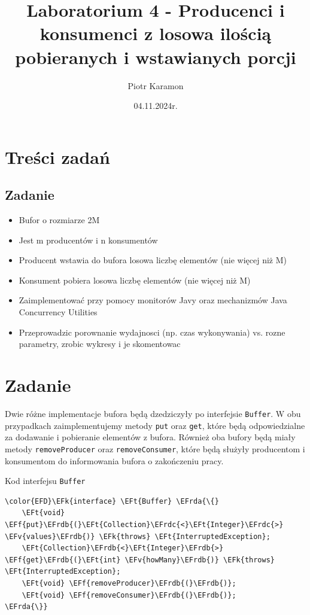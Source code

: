 \documentclass[11pt]{article}
\author{Piotr Karamon}
\date{04.11.2024r.}
\title{Laboratorium 4 - Producenci i konsumenci z losowa ilością pobieranych i wstawianych porcji}
\newcommand{\EFk}[1]{\textcolor{EFk}{#1}} %
\newcommand{\EFf}[1]{\textcolor{EFf}{#1}} %
\newcommand{\EFv}[1]{\textcolor{EFv}{#1}} %
\newcommand{\EFt}[1]{\textcolor{EFt}{#1}} %
\newcommand{\EFrda}[1]{#1} %
\newcommand{\EFrdb}[1]{\textcolor{EFrdb}{#1}} %
\newcommand{\EFrdc}[1]{\textcolor{EFrdc}{#1}} %
\begin{document}
\maketitle
\section*{Treści zadań}
\label{sec:org5d5573e}
\subsection*{Zadanie}
\label{sec:org112a257}
\begin{itemize}
\item Bufor o rozmiarze 2M
\item Jest m producentów i n konsumentów
\item Producent wstawia do bufora losowa liczbę elementów (nie więcej niż M)
\item Konsument pobiera losowa liczbę elementów (nie więcej niż M)
\item Zaimplementować przy pomocy monitorów Javy oraz mechanizmów Java Concurrency Utilities
\item Przeprowadzic porownanie wydajnosci (np. czas wykonywania) vs. rozne parametry, zrobic wykresy i je skomentowac
\end{itemize}
\section*{Zadanie}
\label{sec:org8ffce0d}
Dwie różne implementacje bufora będą dzedziczyły po interfejsie \texttt{Buffer}. W obu
przypadkach zaimplementujemy metody \texttt{put} oraz \texttt{get}, które będą odpowiedzialne za
dodawanie i pobieranie elementów z bufora. Również oba bufory będą miały metody
\texttt{removeProducer} oraz \texttt{removeConsumer}, które będą służyły producentom i konsumentom
do informowania bufora o zakończeniu pracy.

Kod interfejsu \texttt{Buffer}
\begin{Code}
\begin{Verbatim}
\color{EFD}\EFk{interface} \EFt{Buffer} \EFrda{\{}
    \EFt{void} \EFf{put}\EFrdb{(}\EFt{Collection}\EFrdc{<}\EFt{Integer}\EFrdc{>} \EFv{values}\EFrdb{)} \EFk{throws} \EFt{InterruptedException};
    \EFt{Collection}\EFrdb{<}\EFt{Integer}\EFrdb{>} \EFf{get}\EFrdb{(}\EFt{int} \EFv{howMany}\EFrdb{)} \EFk{throws} \EFt{InterruptedException};
    \EFt{void} \EFf{removeProducer}\EFrdb{(}\EFrdb{)};
    \EFt{void} \EFf{removeConsumer}\EFrdb{(}\EFrdb{)};
\EFrda{\}}
\end{Verbatim}
\end{Code}
\end{document}
